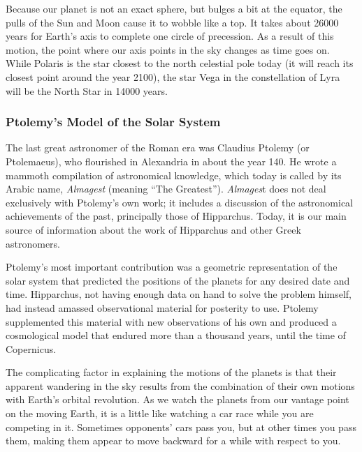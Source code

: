 \documentclass[main.tex]{subfiles}
\begin{document}
\vspace{1em}


Because our planet is not an exact sphere, but bulges a bit at the equator, the pulls of the Sun and Moon cause it to wobble like a top. It takes about \num{26000} years for Earth's axis to complete one circle of precession. As a result of this motion, the point where our axis points in the sky changes as time goes on. While Polaris is the star closest to the north celestial pole today (it will reach its closest point around the year 2100), the star Vega in the constellation of Lyra will be the North Star in \num{14000} years.

\subsubsection*{Ptolemy's Model of the Solar System}

The last great astronomer of the Roman era was Claudius Ptolemy (or Ptolemaeus), who flourished in Alexandria in about the year 140. He wrote a mammoth compilation of astronomical knowledge, which today is called by its Arabic name, \textit{Almagest} (meaning ``The Greatest''). \textit{Almages}t does not deal exclusively with Ptolemy's own work; it includes a discussion of the astronomical achievements of the past, principally those of Hipparchus. Today, it is our main source of information about the work of Hipparchus and other Greek astronomers.

\vspace{1em}

Ptolemy's most important contribution was a geometric representation of the solar system that predicted the positions of the planets for any desired date and time. Hipparchus, not having enough data on hand to solve the problem himself, had instead amassed observational material for posterity to use. Ptolemy supplemented this material with new observations of his own and produced a cosmological model that endured more than a thousand years, until the time of Copernicus.

\vspace{1em}

The complicating factor in explaining the motions of the planets is that their apparent wandering in the sky results from the combination of their own motions with Earth's orbital revolution. As we watch the planets from our vantage point on the moving Earth, it is a little like watching a car race while you are competing in it. Sometimes opponents' cars pass you, but at other times you pass them, making them appear to move backward for a while with respect to you.
\end{document}
